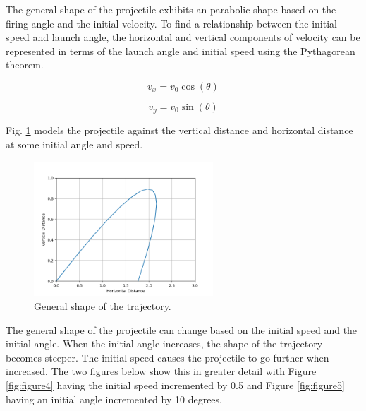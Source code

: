\documentclass[12pt]{iopart} %
\begin{document}
\begin{center}
\subtitle{\textbf{Trajectories}}
\end{center}

The general shape of the projectile exhibits an parabolic shape based on the firing angle and the initial velocity. 
To find a relationship between the initial speed and launch angle, the horizontal and vertical components of velocity can be represented in terms of the launch angle and initial speed using the Pythagorean theorem.

\begin{equation} \label{eq:vocostheta}
  v_x = v_{0} \cos(\theta)
\end{equation}

\begin{equation} \label{eq:vosintheta}
  v_y = v_{0} \sin(\theta)
\end{equation}

Fig. \ref{fig:figure3} models the projectile against the vertical distance and horizontal distance at some initial angle and speed.

\begin{figure}[h!tbp]
  \begin{center}
 \item[]\includegraphics[width=0.6\textwidth]{figure3.png}
  \caption{\label{fig:figure3}
  General shape of the trajectory.
  }
  \end{center}
\end{figure}

The general shape of the projectile can change based on the initial speed and the initial angle. 
When the initial angle increases, the shape of the trajectory becomes steeper. 
The initial speed causes the projectile to go further when increased. 
The two figures below show this in greater detail with Figure \ref{fig:figure4} having the initial speed incremented by 0.5 and Figure \ref{fig:figure5} having an initial angle incremented by 10 degrees.
\end{document}
